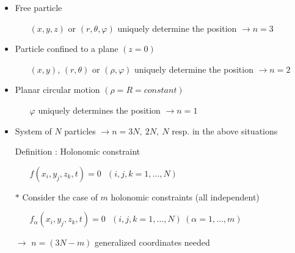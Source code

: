 \Tr
\begin{itemize}
\item Free particle
\begin{itemize}
\item[] $(x,y,z)$ or $(r,\theta,\varphi)$ uniquely determine the position $\rightarrow n=3$
\end{itemize}
\item Particle confined to a plane $(z=0)$
\begin{itemize}
\item[] $(x,y)$, $(r,\theta)$ or $(\rho,\varphi)$ uniquely determine the position $\rightarrow n=2$
\end{itemize}
\item Planar circular motion $(\rho=R=constant)$
\begin{itemize}
\item[] $\varphi$ uniquely determines the position $\rightarrow n=1$
\end{itemize}
\item {\red System of $N$ particles} $\rightarrow n=3N,~2N,~N$ resp. in the above situations
\item[] Definition : {\blue Holonomic constraint}
\begin{itemize}
\item[] {\blue $f(x_{i},y_{j},z_{k},t)=0 ~~~(i,j,k=1,\ldots,N)$}
\end{itemize}
\item[$\ast$] Consider the case of $m$ holonomic constraints (all independent)
\begin{itemize}
\item[] $f_{\alpha}(x_{i},y_{j},z_{k},t)=0 
        ~~~(i,j,k=1,\ldots,N)~(\alpha=1,\ldots,m)$
\end{itemize}
\item[] $\rightarrow$ {\blue $n=(3N-m)$ generalized coordinates needed}
\end{itemize}


